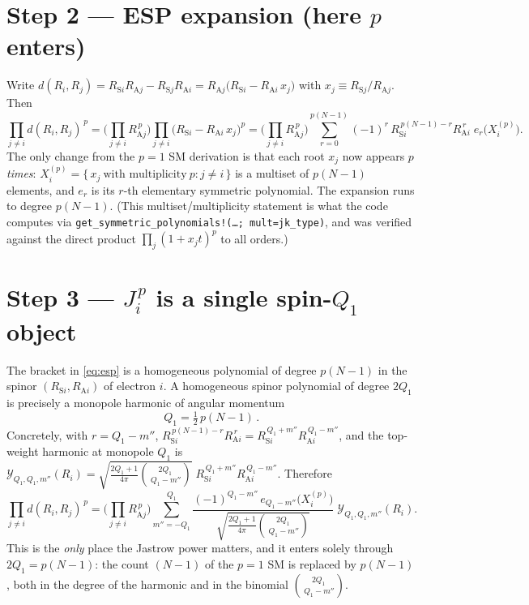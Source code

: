 \documentclass[11pt]{article}
\newcommand{\Ycal}{\mathcal{Y}}
\begin{document}
\section{Step 2 --- ESP expansion (here $p$ enters)}

Write $d(R_i,R_j)=R_{\mathrm{S}i}R_{\mathrm{A}j}-R_{\mathrm{S}j}R_{\mathrm{A}i}
=R_{\mathrm{A}j}\big(R_{\mathrm{S}i}-R_{\mathrm{A}i}\,x_j\big)$ with $x_j\equiv R_{\mathrm{S}j}/R_{\mathrm{A}j}$.
Then
\begin{equation}
  \prod_{j\neq i} d(R_i,R_j)^{\,p}
  =\Big(\prod_{j\neq i}R_{\mathrm{A}j}^{\,p}\Big)
   \prod_{j\neq i}\big(R_{\mathrm{S}i}-R_{\mathrm{A}i}\,x_j\big)^{p}
  =\Big(\prod_{j\neq i}R_{\mathrm{A}j}^{\,p}\Big)
   \sum_{r=0}^{p(N-1)}(-1)^{r}\,R_{\mathrm{S}i}^{\,p(N-1)-r}R_{\mathrm{A}i}^{\,r}\;
   e_{r}\!\big(X_i^{(p)}\big).
  \label{eq:esp}
\end{equation}
The only change from the $p=1$ SM derivation is that each root $x_j$ now appears \emph{$p$ times}:
$X_i^{(p)}=\{\,x_j\ \text{with multiplicity}\ p : j\neq i\,\}$ is a multiset of $p(N-1)$ elements,
and $e_r$ is its $r$-th elementary symmetric polynomial. The expansion runs to degree $p(N-1)$.
(This multiset/multiplicity statement is what the code computes via
\texttt{get\_symmetric\_polynomials!(\dots; mult=jk\_type)}, and was verified against the direct
product $\prod_j(1+x_j t)^p$ to all orders.)

\section{Step 3 --- $J_i^{\,p}$ is a single spin-$Q_1$ object}

The bracket in \eqref{eq:esp} is a homogeneous polynomial of degree $p(N-1)$ in the spinor
$(R_{\mathrm{S}i},R_{\mathrm{A}i})$ of electron $i$. A homogeneous spinor polynomial of degree
$2Q_1$ is precisely a monopole harmonic of angular momentum
\begin{equation}
  \boxed{\,Q_1=\tfrac{1}{2}\,p(N-1)\,}.
\end{equation}
Concretely, with $r=Q_1-m''$,
$R_{\mathrm{S}i}^{\,p(N-1)-r}R_{\mathrm{A}i}^{\,r}=R_{\mathrm{S}i}^{\,Q_1+m''}R_{\mathrm{A}i}^{\,Q_1-m''}$,
and the top-weight harmonic at monopole $Q_1$ is
$\Ycal_{Q_1,Q_1,m''}(R_i)=\sqrt{\tfrac{2Q_1+1}{4\pi}\binom{2Q_1}{\,Q_1-m''}}\;
R_{\mathrm{S}i}^{\,Q_1+m''}R_{\mathrm{A}i}^{\,Q_1-m''}$.
Therefore
\begin{equation}
  \prod_{j\neq i} d(R_i,R_j)^{\,p}
  =\Big(\prod_{j\neq i}R_{\mathrm{A}j}^{\,p}\Big)
   \sum_{m''=-Q_1}^{Q_1}\frac{(-1)^{Q_1-m''}\,e_{Q_1-m''}\!\big(X_i^{(p)}\big)}
        {\sqrt{\tfrac{2Q_1+1}{4\pi}\binom{2Q_1}{\,Q_1-m''}}}\;\Ycal_{Q_1,Q_1,m''}(R_i).
  \label{eq:harmonic}
\end{equation}
This is the \emph{only} place the Jastrow power matters, and it enters solely through
$2Q_1=p(N-1)$: the count $(N-1)$ of the $p=1$ SM is replaced by $p(N-1)$, both in the degree of
the harmonic and in the binomial $\binom{2Q_1}{\,Q_1-m''}$.
\end{document}
